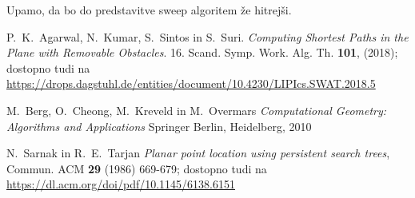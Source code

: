\documentclass{article}
\begin{document}
Upamo, da bo do predstavitve sweep algoritem že hitrejši.



\begin{thebibliography}{99}

     P.~K.~Agarwal, N.~Kumar, S.~Sintos in S.~Suri. \emph{Computing Shortest Paths in the Plane with Removable Obstacles}. 16. Scand. Symp. Work. Alg. Th. \textbf{101}, (2018);
    dostopno tudi na \url{https://drops.dagstuhl.de/entities/document/10.4230/LIPIcs.SWAT.2018.5}


     M.~Berg, O.~Cheong, M.~Kreveld in  M.~Overmars \emph{Computational Geometry: Algorithms and Applications} Springer Berlin, Heidelberg, 2010

     N.~Sarnak in R.~E.~Tarjan \emph{Planar point location using persistent search trees}, Commun. ACM \textbf{29} (1986) 669-679; dostopno tudi na \url{https://dl.acm.org/doi/pdf/10.1145/6138.6151}

\end{thebibliography}
\end{document}
